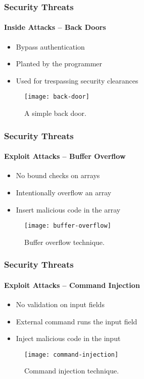 \documentclass{beamer}
\begin{document}
	\begin{frame}
	\frametitle{Security Threats}
	\framesubtitle{Inside Attacks -- Back Doors}
	\begin{itemize}
	\setlength\itemsep{0.5em}
		\item Bypass authentication
		\item Planted by the programmer
		\item Used for trespassing security clearances
	\end{itemize}
	\begin{figure}
		\centering
		\texttt{[image: back-door]}
		\caption{A simple back door.}
	\end{figure}
	\end{frame}

	\begin{frame}
	\frametitle{Security Threats}
	\framesubtitle{Exploit Attacks -- Buffer Overflow}
	\begin{itemize}
	\setlength\itemsep{0.5em}
		\item No bound checks on arrays
		\item Intentionally overflow an array
		\item Insert malicious code in the array
	\end{itemize}
	\begin{figure}
		\centering
		\texttt{[image: buffer-overflow]}
		\caption{Buffer overflow technique.}
	\end{figure}
	\end{frame}

	\begin{frame}
	\frametitle{Security Threats}
	\framesubtitle{Exploit Attacks -- Command Injection}
	\begin{itemize}
	\setlength\itemsep{0.5em}
		\item No validation on input fields
		\item External command runs the input field
		\item Inject malicious code in the input
	\end{itemize}
	\begin{figure}
		\centering
		\texttt{[image: command-injection]}
		\caption{Command injection technique.}
	\end{figure}
	\end{frame}
	
\end{document}
